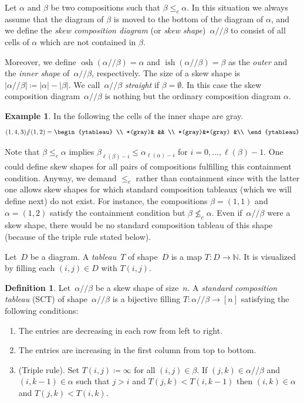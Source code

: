 \documentclass[10pt]{amsart}
\theoremstyle{plain}
\theoremstyle{plain}
\theoremstyle{plain}
\theoremstyle{plain}
\theoremstyle{plain}
\theoremstyle{definition}
\newtheorem{defi}[defi]{Definition}
\theoremstyle{definition}
\newtheorem{exam}[exam]{Example}
\newcommand{\N}{\mathbb N}
\DeclareMathOperator{\osh}{osh}
\DeclareMathOperator{\ish}{ish}
\newcommand{\skc}{/ \! \! / }
\newcommand{\ab}{{\alpha / \! \! / \beta}}
\begin{document}
Let $\alpha$ and $\beta$ be two compositions such that $\beta \leq_c \alpha$. In this situation we always assume that the diagram of $\beta$ is moved to the bottom of the diagram of $\alpha$, and we define the \emph{skew composition diagram} (or \emph{skew shape})~$\ab$ to consist of all cells of $\alpha$ which are not contained in $\beta$.

Moreover, we define $\osh(\ab)= \alpha$ and $\ish(\ab)= \beta$ as the \emph{outer} and the \emph{inner shape} of~$\ab$, respectively. 
The size of a skew shape is $|\ab| \coloneqq |\alpha| - |\beta|$.
We call~$\ab$ \emph{straight} if $\beta = \emptyset$.
In this case the skew composition diagram~$\ab$ is nothing but the ordinary composition diagram $\alpha$.

\begin{exam} In the following the cells of the inner shape are gray.
	\[
		(1,4,3) \skc (1,2) =
		\begin{ytableau} 
			 \\
			*(gray)&		&& \\
			*(gray)&*(gray)	&\\
		\end{ytableau}
	\]	
\end{exam}

Note that $\beta \leq_c \alpha$ implies $\beta_{\ell(\beta)-i} \leq \alpha_{\ell(\alpha) - i}$ for $i=0,\dots, \ell(\beta) - 1$. One could define skew shapes for all pairs of compositions fulfilling this containment condition.
Anyway, we demand $\leq_c$ rather than containment since with the latter one allows skew shapes for which standard composition tableaux (which we will define next) do not exist.
For instance, the compositions $\beta = (1,1)$ and $\alpha = (1,2)$ satisfy the containment condition but $\beta \not \leq_c \alpha$.
Even if~$\ab$ were a skew shape, there would be no standard composition tableau of this shape (because of the triple rule stated below).

Let~$D$ be a diagram. A \emph{tableau}~$T$ of shape~$D$ is a map $T\colon D \to \N$. It is visualized by filling each $(i,j)\in D$ with $T(i,j)$.

\begin{defi}
	Let~$\ab$ be a skew shape of size~$n$. A \emph{standard composition tableau} (SCT) of shape~$\ab$ is a bijective filling $T\colon \ab \to [n]$ satisfying the following conditions:
	\begin{enumerate}
		\item
		The entries are decreasing in each row from left to right.
		\item
		The entries are increasing in the first column from top to bottom.		
		\item
		(Triple rule). Set $T(i,j)\coloneqq \infty$ for all $(i,j)\in \beta$.
		If $(j,k)\in \alpha \skc \beta$ and $(i,k-1)\in \alpha$ such that $j > i$ and $T(j,k) < T(i,k-1)$ then $(i,k) \in \alpha$ and $T(j,k) < T(i,k)$.

	\end{enumerate}
\end{defi}
\end{document}
